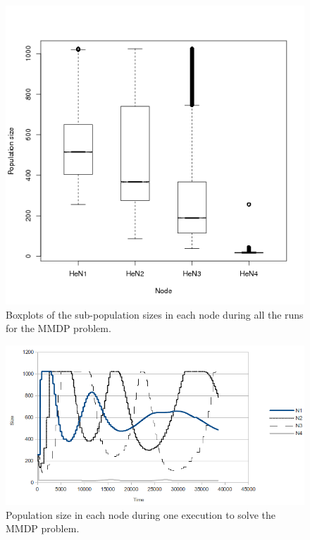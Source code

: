 \begin{figure}
\centering
 \includegraphics[scale =0.4] {gfx/adaptiveresults/sizesMMDP.png}
\caption{Boxplots of the sub-population sizes in each node during all the runs for the MMDP problem.}
\label{fig:sizesMMDP}
\end{figure}

\begin{figure}
\centering
 \includegraphics[scale =0.4] {gfx/adaptiveresults/sizesMMDP1ejec.png}
\caption{Population size in each node during one execution to solve the MMDP problem.}
\label{fig:sizesMMDP1ejec}
\end{figure}



